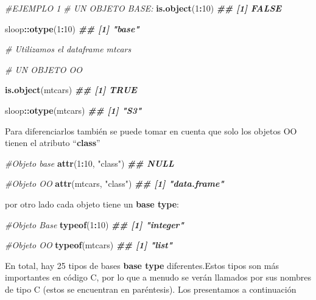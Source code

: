 \documentclass[
]{book}
\newenvironment{Shaded}{\begin{snugshade}}{\end{snugshade}}
\newcommand{\CommentTok}[1]{\textcolor[rgb]{0.56,0.35,0.01}{\textit{#1}}}
\newcommand{\DecValTok}[1]{\textcolor[rgb]{0.00,0.00,0.81}{#1}}
\newcommand{\DocumentationTok}[1]{\textcolor[rgb]{0.56,0.35,0.01}{\textbf{\textit{#1}}}}
\newcommand{\FunctionTok}[1]{\textcolor[rgb]{0.13,0.29,0.53}{\textbf{#1}}}
\newcommand{\NormalTok}[1]{#1}
\newcommand{\SpecialCharTok}[1]{\textcolor[rgb]{0.81,0.36,0.00}{\textbf{#1}}}
\newcommand{\StringTok}[1]{\textcolor[rgb]{0.31,0.60,0.02}{#1}}
\begin{document}
\begin{Shaded}
\begin{Highlighting}[]

\CommentTok{\#EJEMPLO 1}
\CommentTok{\# UN OBJETO BASE:}
\FunctionTok{is.object}\NormalTok{(}\DecValTok{1}\SpecialCharTok{:}\DecValTok{10}\NormalTok{)}
\DocumentationTok{\#\# [1] FALSE}

\NormalTok{sloop}\SpecialCharTok{::}\FunctionTok{otype}\NormalTok{(}\DecValTok{1}\SpecialCharTok{:}\DecValTok{10}\NormalTok{)}
\DocumentationTok{\#\# [1] "base"}

\CommentTok{\# Utilizamos el dataframe mtcars}

\CommentTok{\# UN OBJETO OO}

\FunctionTok{is.object}\NormalTok{(mtcars)}
\DocumentationTok{\#\# [1] TRUE}

\NormalTok{sloop}\SpecialCharTok{::}\FunctionTok{otype}\NormalTok{(mtcars)}
\DocumentationTok{\#\# [1] "S3"}
\end{Highlighting}
\end{Shaded}

Para diferenciarlos también se puede tomar en cuenta que solo los objetos OO tienen el atributo ``\textbf{class}''

\begin{Shaded}
\begin{Highlighting}[]
\CommentTok{\#Objeto base}
\FunctionTok{attr}\NormalTok{(}\DecValTok{1}\SpecialCharTok{:}\DecValTok{10}\NormalTok{, }\StringTok{"class"}\NormalTok{)}
\DocumentationTok{\#\# NULL}


\CommentTok{\#Objeto OO}
\FunctionTok{attr}\NormalTok{(mtcars, }\StringTok{"class"}\NormalTok{)}
\DocumentationTok{\#\# [1] "data.frame"}
\end{Highlighting}
\end{Shaded}

por otro lado cada objeto tiene un \textbf{base type}:

\begin{Shaded}
\begin{Highlighting}[]
\CommentTok{\#Objeto Base}
\FunctionTok{typeof}\NormalTok{(}\DecValTok{1}\SpecialCharTok{:}\DecValTok{10}\NormalTok{)}
\DocumentationTok{\#\# [1] "integer"}


\CommentTok{\#Objeto OO}
\FunctionTok{typeof}\NormalTok{(mtcars)}
\DocumentationTok{\#\# [1] "list"}
\end{Highlighting}
\end{Shaded}

En total, hay 25 tipos de bases \textbf{base type} diferentes.Estos tipos son más importantes en código C, por lo que a menudo se verán llamados por sus nombres de tipo C (estos se encuentran en paréntesis). Los presentamos a continuación
\end{document}
